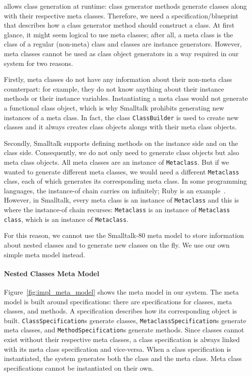 \msname allows class generation at runtime: class generator methods generate classes along with their respective meta classes. Therefore, we need a specification/blueprint that describes how a class generator method should construct a class. At first glance, it might seem logical to use meta classes; after all, a meta class is the class of a regular (non-meta) class and classes are instance generators. However, meta classes cannot be used as class object generators in a way required in our system for two reasons.

Firstly, meta classes do not have any information about their non-meta class counterpart: for example, they do not know anything about their instance methods or their instance variables. Instantiating a meta class would not generate a functional class object, which is why Smalltalk prohibits generating new instances of a meta class. In fact, the class \texttt{ClassBuilder} is used to create new classes and it always creates class objects alongs with their meta class objects.

Secondly, Smalltalk supports defining methods on the instance side and on the class side. Consequently, we do not only need to generate class objects but also meta class objects. All meta classes are an instance of \texttt{Metaclass}. But if we wanted to generate different meta classes, we would need a different \texttt{Metaclass} class, each of which generates its corresponding meta class. In some programming languages, the instance-of chain carries on infinitely; Ruby is an example~\cite{pavlata2012ruby}. However, in Smalltalk, every meta class is an instance of \texttt{Metaclass} and this is where the instance-of chain recurses: \texttt{Metaclass} is an instance of \texttt{Metaclass class}, which is an instance of \texttt{Metaclass}.

For this reason, we cannot use the Smalltalk-80 meta model to store information about nested classes and to generate new classes on the fly. We use our own simple meta model instead.

\paragraph{Nested Classes Meta Model}
Figure~\ref{fig:impl_meta_model} shows the meta model in our system. The meta model is built around specifications: there are specifications for classes, meta classes, and methods. A specification describes how its corresponding object is built. \texttt{ClassSpecification}s generate classes, \texttt{MetaclassSpecification}s generate meta classes, and \texttt{MethodSpecification}s generate methods. Since classes cannot exist without their respective meta classes, a class specification is always linked with its meta class specification and vice-versa. When a class specification is instantiated, the system generates both the class and the meta class. Meta class specifications cannot be instantiated on their own.

